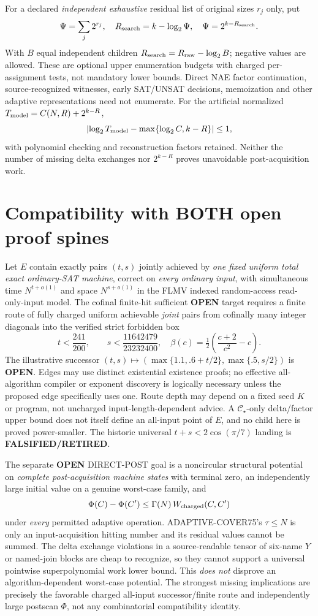\documentclass[11pt]{article}
\newcommand{\CS}{\mathcal C_{\star}}
\begin{document}
For a declared \emph{independent exhaustive} residual list of original sizes $r_j$ only, put
\[
\Psi=\sum_j 2^{r_j},\quad R_{\rm search}=k-\log_2\Psi,\quad
\Psi=2^{k-R_{\rm search}}.
\]
With $B$ equal independent children $R_{\rm search}=R_{\rm raw}-\log_2 B$; negative values are allowed. These are optional upper enumeration budgets with charged per-assignment tests, not mandatory lower bounds. Direct NAE factor continuation, source-recognized witnesses, early SAT/UNSAT decisions, memoization and other adaptive representations need not enumerate. For the artificial normalized $T_{\rm model}=C(N,R)+2^{k-R}$,
\[
\left|\log_2T_{\rm model}-\max\{\log_2 C,k-R\}\right|\le1,
\]
with polynomial checking and reconstruction factors retained. Neither the number of missing delta exchanges nor $2^{k-R}$ proves unavoidable post-acquisition work.

\section{Compatibility with BOTH open proof spines}
Let $E$ contain exactly pairs $(t,s)$ jointly achieved by \emph{one fixed uniform total exact ordinary-SAT machine}, correct on \emph{every ordinary input}, with simultaneous time $N^{t+o(1)}$ and space $N^{s+o(1)}$ in the FLMV indexed random-access read-only-input model. The cofinal finite-hit sufficient \textbf{OPEN} target requires a finite route of fully charged uniform achievable \emph{joint} pairs from cofinally many integer diagonals into the verified strict forbidden box
\[
t<\frac{241}{200},\qquad s<\frac{11642479}{23232400},
\quad \beta(c)=\tfrac12\left(\frac{c+2}{c^2}-c\right).
\]
The illustrative successor $(t,s)\mapsto(\max\{1.1,.6+t/2\},\max\{.5,s/2\})$ is \textbf{OPEN}. Edges may use distinct existential existence proofs; no effective all-algorithm compiler or exponent discovery is logically necessary unless the proposed edge specifically uses one. Route depth may depend on a fixed seed $K$ or program, not uncharged input-length-dependent advice. A $\CS$-only delta/factor upper bound does not itself define an all-input point of $E$, and no child here is proved power-smaller. The historic universal $t+s<2\cos(\pi/7)$ landing is \textbf{FALSIFIED/RETIRED}.

The separate \textbf{OPEN} DIRECT-POST goal is a noncircular structural potential on \emph{complete post-acquisition machine states} with terminal zero, an independently large initial value on a genuine worst-case family, and
\[
\Phi(C)-\Phi(C')\le\Gamma(N)\,
W_{\rm charged}(C,C')
\]
under \emph{every} permitted adaptive operation. ADAPTIVE-COVER75's $\tau\le N$ is only an input-acquisition hitting number and its residual values cannot be summed. The delta exchange violations in a source-readable tensor of six-name $Y$ or named-join blocks are cheap to recognize, so they cannot support a universal pointwise superpolynomial work lower bound. This \emph{does not} disprove an algorithm-dependent worst-case potential. The strongest missing implications are precisely the favorable charged all-input successor/finite route and independently large postscan $\Phi$, not any combinatorial compatibility identity.
\end{document}
